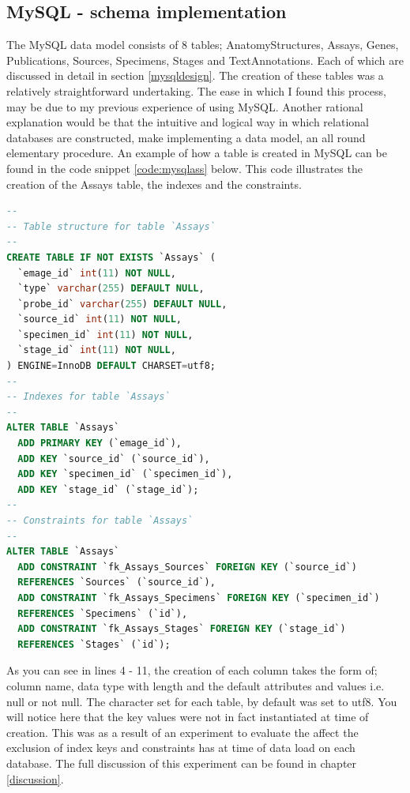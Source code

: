 \subsection{MySQL - schema implementation}
The MySQL data model consists of 8 tables; AnatomyStructures, Assays, Genes, Publications, Sources, Specimens, Stages and TextAnnotations. Each of which are discussed in detail in section \ref{mysqldesign}. The creation of these tables was a relatively straightforward undertaking. The ease in which I found this process, may be due to my previous experience of using MySQL. Another rational explanation would be that the intuitive and logical way in which relational databases are constructed, make implementing a data model, an all round elementary procedure. An example of how a table is created in MySQL can be found in the code snippet \ref{code:mysqlass} below. This code illustrates the creation of the Assays table, the indexes and the constraints.
\newpage
\vspace*{\fill}
\begin{lstlisting}[language=SQL, caption=Creation of Assays table in MySQL., label=code:mysqlass]
--
-- Table structure for table `Assays`
--
CREATE TABLE IF NOT EXISTS `Assays` (
  `emage_id` int(11) NOT NULL,
  `type` varchar(255) DEFAULT NULL,
  `probe_id` varchar(255) DEFAULT NULL,
  `source_id` int(11) NOT NULL,
  `specimen_id` int(11) NOT NULL,
  `stage_id` int(11) NOT NULL,
) ENGINE=InnoDB DEFAULT CHARSET=utf8;
--
-- Indexes for table `Assays`
--
ALTER TABLE `Assays`
  ADD PRIMARY KEY (`emage_id`),
  ADD KEY `source_id` (`source_id`),
  ADD KEY `specimen_id` (`specimen_id`),
  ADD KEY `stage_id` (`stage_id`);
--
-- Constraints for table `Assays`
--
ALTER TABLE `Assays`
  ADD CONSTRAINT `fk_Assays_Sources` FOREIGN KEY (`source_id`)
  REFERENCES `Sources` (`source_id`),
  ADD CONSTRAINT `fk_Assays_Specimens` FOREIGN KEY (`specimen_id`)
  REFERENCES `Specimens` (`id`),
  ADD CONSTRAINT `fk_Assays_Stages` FOREIGN KEY (`stage_id`)
  REFERENCES `Stages` (`id`);
\end{lstlisting}
\vspace*{\fill}
\newpage

As you can see in lines 4 - 11, the creation of each column takes the form of; column name, data type with length and the default attributes and values i.e. null or not null. The character set for each table, by default was set to utf8. You will notice here that the key values were not in fact instantiated at time of creation. This was as a result of an experiment to evaluate the affect the exclusion of index keys and constraints has at time of data load on each database. The full discussion of this experiment can be found in chapter \ref{discussion}.

